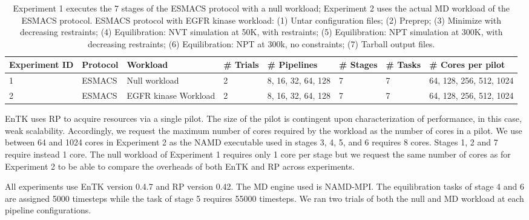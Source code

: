 \begin{table}[t]
\centering
\caption{Experiment 1 executes the 7 stages of the ESMACS protocol with
a null workload; Experiment 2 uses the actual MD workload of the ESMACS
protocol. ESMACS protocol with EGFR kinase workload: (1) Untar configuration
files; (2) Preprep; (3) Minimize with decreasing restraints; (4)
Equilibration: NVT simulation at 50K, with restraints; (5) Equilibration: NPT
simulation at 300K, with decreasing restraints; (6) Equilibration: NPT at
300k, no constraints; (7) Tarball output files.}\label{tab:exp}
\begin{tabular}{llllllll}
\toprule
\textbf{Experiment ID}      &
\textbf{Protocol}           &
\textbf{Workload}           &
\textbf{\# Trials}          &
\textbf{\# Pipelines}       &
\textbf{\# Stages}          &
\textbf{\# Tasks}           &
\textbf{\# Cores per pilot} \\
\toprule
%
1                           &
ESMACS                      &
Null workload               &
2                           &
8, 16, 32, 64, 128          &
7                           &
7                           &
64, 128, 256, 512, 1024     \\
%
2                           &
ESMACS                      &
EGFR kinase Workload        &
2                           &
8, 16, 32, 64, 128          &
7                           &
7                           &
64, 128, 256, 512, 1024     \\
\bottomrule
\end{tabular}
\end{table}

EnTK uses RP to acquire resources via a single pilot. The size of the pilot is
contingent upon characterization of performance, in this case, weak
scalability. Accordingly, we request the maximum number of cores required by
the workload as the number of cores in a pilot. We use between 64 and 1024
cores in Experiment 2 as the NAMD executable used in stages 3, 4, 5, and 6
requires 8 cores. Stages 1, 2 and 7 require instead 1 core. The null workload
of Experiment 1 requires only 1 core per stage but we request the same number
of cores as for Experiment 2 to be able to compare the overheads of both EnTK
and RP across experiments.


All experiments use EnTK version 0.4.7 and RP version 0.42. The MD engine used
is NAMD-MPI\@. The equilibration tasks of stage 4 and 6 are assigned 5000
timesteps while the task of stage 5 requires 55000 timesteps. We ran two
trials of both the null and MD workload at each pipeline configurations.

